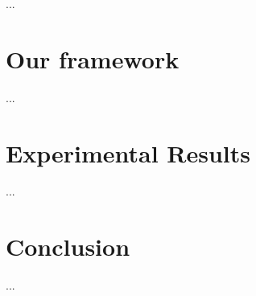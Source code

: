 \documentclass{esannV2}
\begin{document}
...

\section{Our framework}
...

\section{Experimental Results}
...

\section{Conclusion}
...


\begin{footnotesize}







\end{footnotesize}

\end{document}
